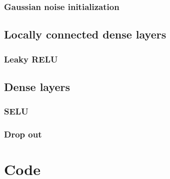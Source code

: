 \section{Gaussian noise initialization}

\chapter{Locally connected dense layers}

\section{Leaky RELU}

\chapter{Dense layers}

\section{SELU}

\section{Drop out}

\part{Code}



